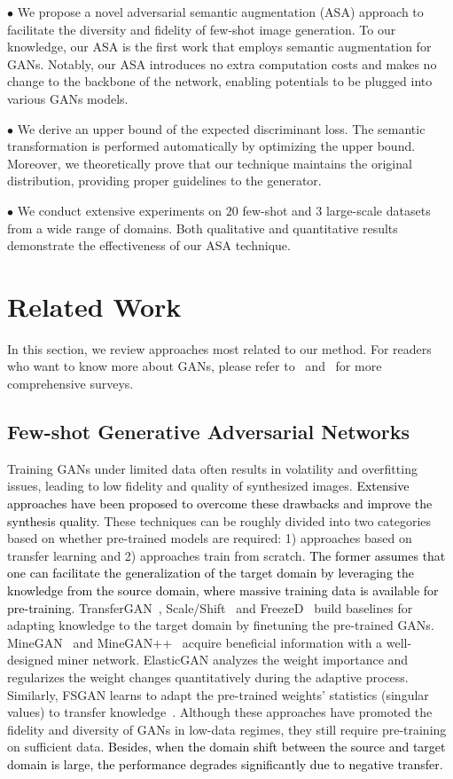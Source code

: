 \documentclass[10pt,journal,compsoc]{IEEEtran}
\newcommand{\revise}[1]{\textcolor{black}{#1}}
\begin{document}
$\bullet$
We propose a novel adversarial semantic augmentation (ASA) approach to facilitate the diversity and fidelity of few-shot image generation. To our knowledge, our ASA is the first work that employs semantic augmentation for GANs.
Notably, our ASA introduces no extra computation costs and makes no change to the backbone of the network, enabling potentials to be plugged into various GANs models.

$\bullet$
We derive an upper bound of the expected discriminant loss. The semantic transformation is performed automatically by optimizing the upper bound.
Moreover, we theoretically prove that our technique maintains the original distribution, providing proper guidelines to the generator.

$\bullet$
We conduct extensive experiments on $20$ few-shot and $3$ large-scale datasets from a wide range of domains. Both qualitative and quantitative results demonstrate the effectiveness of our ASA technique.

\section{Related Work}
In this section, we review approaches most related to our method.
For readers who want to know more about GANs, please refer to~\cite{liu2021generative} and~\cite{Survey2021VAE} for more comprehensive surveys.

\subsection{Few-shot Generative Adversarial Networks}
Training GANs under limited data often results in volatility and overfitting issues, leading to low fidelity and quality of synthesized images.
%
\revise{Extensive approaches have been proposed to overcome these drawbacks and improve the synthesis quality}.
%
These techniques can be roughly divided into two categories based on whether pre-trained models are required: 1) approaches based on transfer learning and 2) approaches train from scratch.
%
\revise{The former assumes that one can facilitate the generalization of the target domain by leveraging the knowledge from the source domain, where massive training data is available for pre-training}.
%
TransferGAN~\cite{wang2018transferring}, Scale/Shift~\cite{noguchi2019image} and FreezeD~\cite{mo2020freeze} build baselines for adapting knowledge to the target domain by finetuning the pre-trained GANs.
%
MineGAN~\cite{wang2020minegan} and MineGAN++~\cite{MineGAN++} acquire beneficial information with a well-designed miner network.
%
ElasticGAN\cite{li2020few} analyzes the weight importance and regularizes the weight changes quantitatively during the adaptive process.
%
Similarly, FSGAN learns to adapt the pre-trained weights' statistics (singular values) to transfer knowledge~\cite{robb2020few}.
Although these approaches have promoted the fidelity and diversity of GANs in low-data regimes, they still require pre-training on sufficient data.
\revise{Besides, when the domain shift between the source and target domain is large, the performance degrades significantly due to negative transfer}.
\end{document}
